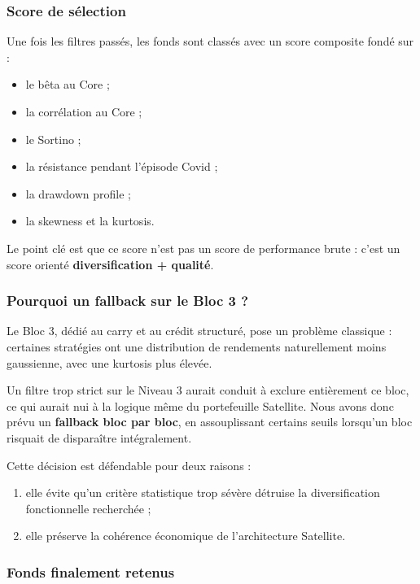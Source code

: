 \documentclass{article}
\begin{document}
\subsubsection{Score de sélection}

Une fois les filtres passés, les fonds sont classés avec un score composite fondé sur :
\begin{itemize}
    \item le bêta au Core ;
    \item la corrélation au Core ;
    \item le Sortino ;
    \item la résistance pendant l’épisode Covid ;
    \item la drawdown profile ;
    \item la skewness et la kurtosis.
\end{itemize}

Le point clé est que ce score n’est pas un score de performance brute : c’est un score orienté \textbf{diversification + qualité}.

\subsubsection{Pourquoi un fallback sur le Bloc 3 ?}

Le Bloc 3, dédié au carry et au crédit structuré, pose un problème classique : certaines stratégies ont une distribution de rendements naturellement moins gaussienne, avec une kurtosis plus élevée.

Un filtre trop strict sur le Niveau 3 aurait conduit à exclure entièrement ce bloc, ce qui aurait nui à la logique même du portefeuille Satellite. Nous avons donc prévu un \textbf{fallback bloc par bloc}, en assouplissant certains seuils lorsqu’un bloc risquait de disparaître intégralement.

Cette décision est défendable pour deux raisons :
\begin{enumerate}
    \item elle évite qu’un critère statistique trop sévère détruise la diversification fonctionnelle recherchée ;
    \item elle préserve la cohérence économique de l’architecture Satellite.
\end{enumerate}

\subsubsection{Fonds finalement retenus}
\end{document}
